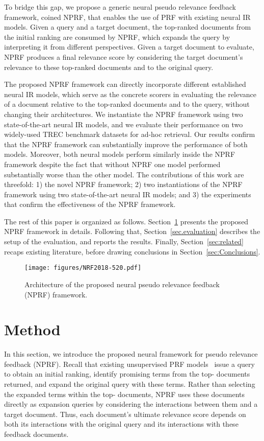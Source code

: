 \documentclass[11pt,a4paper]{article}
\begin{document}
To bridge this gap, we propose a generic neural pseudo relevance feedback framework, coined NPRF,
that enables the use of PRF with existing neural IR models.
Given a query and a target document, the top-ranked documents from the initial ranking
are consumed by NPRF, which
expands the query by interpreting it from different perspectives.
Given a target document to evaluate,
NPRF produces a final relevance score by considering the target document's relevance
to these top-ranked documents and to the original query.


The proposed NPRF framework can directly incorporate different established neural IR models,
which serve as the concrete scorers in evaluating the relevance of a document relative to 
the top-ranked documents and to the query, without changing their architectures.
We instantiate the NPRF framework using two state-of-the-art neural IR models, and 
we evaluate their performance on two widely-used TREC benchmark datasets for ad-hoc retrieval. 
Our results
confirm that the NPRF framework can substantially improve the performance of both models.
Moreover, both neural models perform similarly inside the NPRF framework despite the fact
that without NPRF one model performed substantially worse than the other model.
The contributions of this work are threefold: 1) the novel NPRF framework; 2)
two instantiations of the NPRF framework using
two state-of-the-art neural IR models;
and 3) the experiments that confirm the effectiveness of the
NPRF framework.

The rest of this paper is organized as follows. Section~\ref{sec:Method} presents the proposed NPRF framework in details. Following that, Section~\ref{sec.evaluation} describes the setup of the evaluation, and reports the results. Finally, Section~\ref{sec:related} recaps existing literature, before drawing conclusions in Section~\ref{sec:Conclusions}. \begin{figure*}
    \centering
      \texttt{[image: figures/NRF2018-520.pdf]}
    \caption{Architecture of the proposed neural pseudo relevance feedback (NPRF) framework.}\label{fig.cprfarch}
\end{figure*}

\vspace{\vignore}
\section{Method}\label{sec:Method}
\vspace{\vignore}
In this section, we introduce the proposed neural framework for pseudo relevance feedback (NPRF).
Recall that existing unsupervised PRF models~\cite{rocchio1971relevance,DBLP:conf/sigir/LavrenkoC01,DBLP:conf/trec/YeHHYL09} issue a query 
to obtain an initial ranking, 
identify promising terms from the top- documents returned,
and expand the original query with these terms.
Rather than selecting the expanded terms within the top- documents, NPRF uses these documents directly 
as expansion queries by considering the interactions between them and a target document. Thus, each document's ultimate relevance score depends on both its interactions with the original query
and its interactions with these feedback documents.
\end{document}
